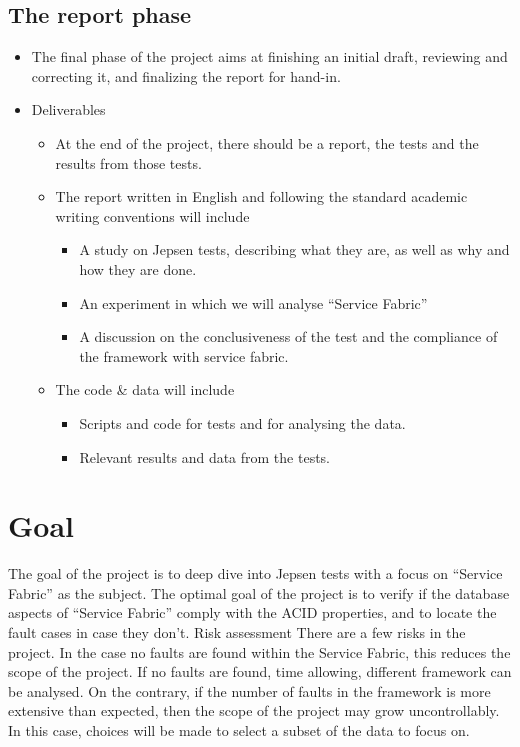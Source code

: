 \subsection{The report phase }
\begin{itemize}
\item The final phase of the project aims at finishing an initial draft, reviewing and correcting it, and finalizing the report for hand-in.
\item	Deliverables 
\begin{itemize}
\item	At the end of the project, there should be a report, the tests and the results from those tests. 
\item	The report written in English and following the standard academic writing conventions will include 
\begin{itemize}
\item	A study on Jepsen tests, describing what they are, as well as why and how they are done.
\item	An experiment in which we will analyse “Service Fabric”	
\item	A discussion on the conclusiveness of the test and the compliance of the framework with service fabric.
\end{itemize}
\item	The code \& data will include
\begin{itemize}
\item	Scripts and code for tests and for analysing the data.
\item	Relevant results and data from the tests. 
\end{itemize}
\end{itemize}
\end{itemize}

\section{Goal}
The goal of the project is to deep dive into Jepsen tests with a focus on “Service Fabric” as the subject. The optimal goal of the project is to verify if the database aspects of “Service Fabric” comply with the ACID properties, and to locate the fault cases in case they don’t.    
Risk assessment 
There are a few risks in the project. In the case no faults are found within the Service Fabric, this reduces the scope of the project. If no faults are found, time allowing, different framework can be analysed. On the contrary, if the number of faults in the framework is more extensive than expected, then the scope of the project may grow uncontrollably. In this case, choices will be made to select a subset of the data to focus on.